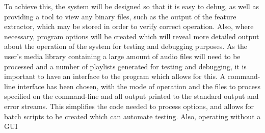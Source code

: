 To achieve this, the system will be designed so that it is easy to debug, as well as providing a tool to view any binary files, such as the output of the feature extractor, which may be stored in order to verify correct operation. Also, where necessary, program options will be created which will reveal more detailed output about the operation of the system for testing and debugging purposes.
\label{text:spec:objective:cli}
As the user's media library containing a large amount of audio files will need to be processed and a number of playlists generated for testing and debugging, it is important to have an interface to the program which allows for this. A command-line interface has been chosen, with the mode of operation and the files to process specified on the command-line and all output printed to the standard output and error streams.
 This simplifies the code needed to process options, and allows for batch scripts to be created which can automate testing. Also, operating without a GUI
